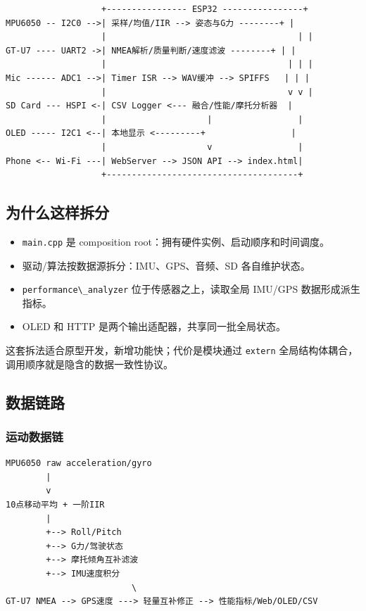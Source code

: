 \documentclass[
  UTF8,11pt,a4paper]{ctexart}
\newcommand{\passthrough}[1]{#1}
\providecommand{\tightlist}{%
  \setlength{\itemsep}{0pt}\setlength{\parskip}{0pt}}
\begin{document}
\begin{lstlisting}
                   +---------------- ESP32 ----------------+
MPU6050 -- I2C0 -->| 采样/均值/IIR --> 姿态与G力 --------+ |
                   |                                      | |
GT-U7 ---- UART2 ->| NMEA解析/质量判断/速度滤波 --------+ | |
                   |                                    | | |
Mic ------ ADC1 -->| Timer ISR --> WAV缓冲 --> SPIFFS   | | |
                   |                                    v v |
SD Card --- HSPI <-| CSV Logger <--- 融合/性能/摩托分析器  |
                   |                    |                 |
OLED ----- I2C1 <--| 本地显示 <---------+                 |
                   |                    v                 |
Phone <-- Wi-Fi ---| WebServer --> JSON API --> index.html|
                   +--------------------------------------+
\end{lstlisting}

\subsection{为什么这样拆分}\label{ux4e3aux4ec0ux4e48ux8fd9ux6837ux62c6ux5206}

\begin{itemize}
\tightlist
\item
  \passthrough{\lstinline!main.cpp!} 是 composition
  root：拥有硬件实例、启动顺序和时间调度。
\item
  驱动/算法按数据源拆分：IMU、GPS、音频、SD 各自维护状态。
\item
  \passthrough{\lstinline!performance\_analyzer!}
  位于传感器之上，读取全局 IMU/GPS 数据形成派生指标。
\item
  OLED 和 HTTP 是两个输出适配器，共享同一批全局状态。
\end{itemize}

这套拆法适合原型开发，新增功能快；代价是模块通过
\passthrough{\lstinline!extern!}
全局结构体耦合，调用顺序就是隐含的数据一致性协议。

\subsection{数据链路}\label{ux6570ux636eux94feux8def}

\subsubsection{运动数据链}\label{ux8fd0ux52a8ux6570ux636eux94fe}

\begin{lstlisting}
MPU6050 raw acceleration/gyro
        |
        v
10点移动平均 + 一阶IIR
        |
        +--> Roll/Pitch
        +--> G力/驾驶状态
        +--> 摩托倾角互补滤波
        +--> IMU速度积分
                         \
GT-U7 NMEA --> GPS速度 ---> 轻量互补修正 --> 性能指标/Web/OLED/CSV
\end{lstlisting}
\end{document}
